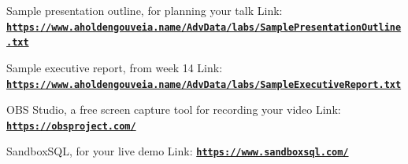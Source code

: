 \documentclass[12pt]{article}
\begin{document}
Sample presentation outline, for planning your talk
Link: \href{https://www.aholdengouveia.name/AdvData/labs/SamplePresentationOutline.txt}{\textbf{\nolinkurl{https://www.aholdengouveia.name/AdvData/labs/SamplePresentationOutline.txt}}}

Sample executive report, from week 14
Link: \href{https://www.aholdengouveia.name/AdvData/labs/SampleExecutiveReport.txt}{\textbf{\nolinkurl{https://www.aholdengouveia.name/AdvData/labs/SampleExecutiveReport.txt}}}

OBS Studio, a free screen capture tool for recording your video
Link: \href{https://obsproject.com/}{\textbf{\nolinkurl{https://obsproject.com/}}}

SandboxSQL, for your live demo
Link: \href{https://www.sandboxsql.com/}{\textbf{\nolinkurl{https://www.sandboxsql.com/}}}
\end{document}
